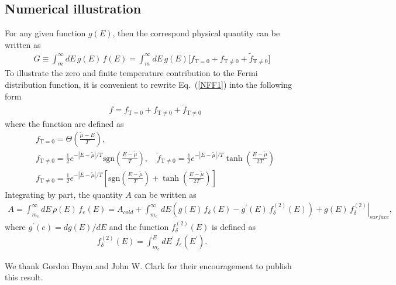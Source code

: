\documentclass[sn-mathphys,Numbered]{sn-jnl}
\begin{document}
\subsection{Numerical illustration}
For any given function $g(E)$, then the correspond physical quantity can be written as
\begin{align}
G\equiv\int^{\infty}_{m}dE\,g(E)\,f(E)=\int^{\infty}_{m}dE\,g(E)\bigg[f_{\mathrm{T=0}}+f_\mathrm{T\neq0}+\tilde f_\mathrm{T\neq0}\bigg]
\end{align}
To illustrate the zero and finite temperature contribution to the Fermi distribution function, it is convenient to rewrite Eq.~(\ref{NFF1}) into the following form
\begin{align}\label{Eq_form}
&f=f_{\mathrm{T=0}}+f_\mathrm{T\neq0}+\tilde f_\mathrm{T\neq0}
\end{align}
where the function are defined as
\begin{align}
&f_{\mathrm{T=0}}=\Theta\left(\frac{\widetilde\mu - E}{T}\right),\\ &f_\mathrm{T\neq0}=\frac{1}{2}e^{ - |E-\widetilde\mu|/T }\mathrm{sgn}\left(\frac{E-\widetilde\mu}{T}\right),\quad\tilde f_\mathrm{T\neq0}=\frac{1}{2}e^{ - |E-\widetilde\mu|/T }\tanh\left(\frac{E-\widetilde\mu}{2T}\right)\\
&f_\mathrm{T\neq0}=\frac{1}{2}e^{ - |E-\widetilde\mu|/T }\left[\mathrm{sgn}\left(\frac{E-\widetilde\mu}{T}\right)+\tanh\left(\frac{E-\widetilde\mu}{2T}\right)\right]
\end{align}
Integrating by part, the quantity $A$ can be written as
\begin{align}
\label{N_electron}
A=\int^{\infty}_{m_e}dE\,\rho(E)\,f_e(E)=A_{cold}+\int^{\infty}_{m_e}\,dE\left(g(E)\,f_\delta(E)-g^\prime(E)\,f^{(2)}_\delta(E)\right)+\left.g(E)\,f^{(2)}_\delta\right|_{surface},
\end{align}
where $g^\prime(e)=dg(E)/dE$ and the function $f^{(2)}_\delta(E)$ is defined as
\begin{align}
f^{(2)}_\delta(E)=\int^E_{m_e}dE^\prime\,f_\epsilon(E^\prime).
\end{align}







\backmatter

We thank Gordon Baym and John W. Clark for their encouragement to publish this result.


\end{document}
